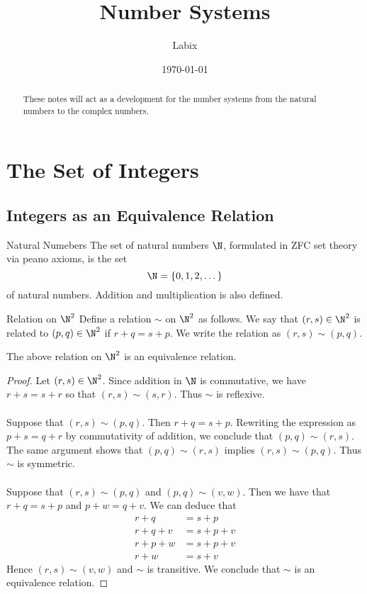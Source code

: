 \documentclass[a4paper]{article}
\title{Number Systems}
\author{Labix}
\date{\today}
\begin{document}
\maketitle
\begin{abstract}
These notes will act as a development for the number systems from the natural numbers to the complex numbers. 
\end{abstract}
\pagebreak
\tableofcontents

\pagebreak
\section{The Set of Integers}
\subsection{Integers as an Equivalence Relation}
\begin{defn}{Natural Numebers}{} The set of natural numbers $\N$, formulated in ZFC set theory via peano axioms, is the set $$\N=\{0,1,2,\dots\}$$ of natural numbers. Addition and multiplication is also defined. 
\end{defn}

\begin{defn}{Relation on $\N^2$}{} Define a relation $\sim$ on $\N^2$ as follows. We say that $(r,s)\in\N^2$ is related to $(p,q)\in\N^2$ if $r+q=s+p$. We write the relation as $(r,s)\sim(p,q)$. 
\end{defn}

\begin{lmm}{}{} The above relation on $\N^2$ is an equivalence relation. \tcbline
\begin{proof}
Let $(r,s)\in\N^2$. Since addition in $\N$ is commutative, we have $r+s=s+r$ so that $(r,s)\sim(s,r)$. Thus $\sim$ is reflexive. \\~\\

Suppose that $(r,s)\sim(p,q)$. Then $r+q=s+p$. Rewriting the expression as $p+s=q+r$ by commutativity of addition, we conclude that $(p,q)\sim(r,s)$. The same argument shows that $(p,q)\sim(r,s)$ implies $(r,s)\sim(p,q)$. Thus $\sim$ is symmetric. \\~\\

Suppose that $(r,s)\sim(p,q)$ and $(p,q)\sim(v,w)$. Then we have that $r+q=s+p$ and $p+w=q+v$. We can deduce that 
\begin{align*}
r+q&=s+p\\
r+q+v&=s+p+v\\
r+p+w&=s+p+v\\
r+w&=s+v
\end{align*}
Hence $(r,s)\sim(v,w)$ and $\sim$ is transitive. We conclude that $\sim$ is an equivalence relation. 
\end{proof}
\end{lmm}
\end{document}
